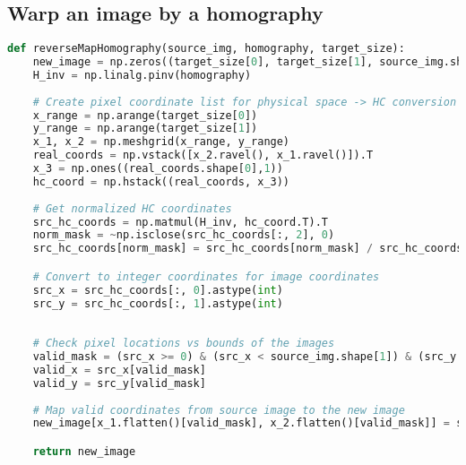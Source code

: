 \documentclass{article}
\begin{document}
\subsection{Warp an image by a homography}
\begin{lstlisting}[language=Python]
def reverseMapHomography(source_img, homography, target_size):
    new_image = np.zeros((target_size[0], target_size[1], source_img.shape[2]), dtype=source_img.dtype)
    H_inv = np.linalg.pinv(homography)
    
    # Create pixel coordinate list for physical space -> HC conversion
    x_range = np.arange(target_size[0])
    y_range = np.arange(target_size[1])
    x_1, x_2 = np.meshgrid(x_range, y_range)
    real_coords = np.vstack([x_2.ravel(), x_1.ravel()]).T
    x_3 = np.ones((real_coords.shape[0],1))
    hc_coord = np.hstack((real_coords, x_3))
    
    # Get normalized HC coordinates
    src_hc_coords = np.matmul(H_inv, hc_coord.T).T
    norm_mask = ~np.isclose(src_hc_coords[:, 2], 0)
    src_hc_coords[norm_mask] = src_hc_coords[norm_mask] / src_hc_coords[norm_mask, 2][:, np.newaxis]

    # Convert to integer coordinates for image coordinates
    src_x = src_hc_coords[:, 0].astype(int)
    src_y = src_hc_coords[:, 1].astype(int)
    
    
    # Check pixel locations vs bounds of the images
    valid_mask = (src_x >= 0) & (src_x < source_img.shape[1]) & (src_y >= 0) & (src_y < source_img.shape[0])
    valid_x = src_x[valid_mask]
    valid_y = src_y[valid_mask]
    
    # Map valid coordinates from source image to the new image
    new_image[x_1.flatten()[valid_mask], x_2.flatten()[valid_mask]] = source_img[valid_y, valid_x]

    return new_image
\end{lstlisting}
\end{document}
